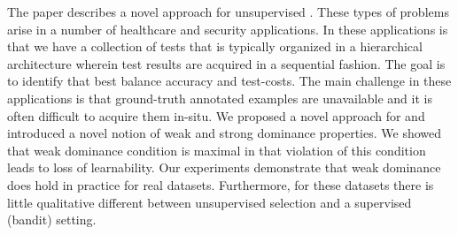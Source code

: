The paper describes a novel approach for unsupervised \ses. These types of problems arise in a number of healthcare and security applications. In these applications is that we have a collection of tests that is typically organized in a hierarchical architecture wherein test results are acquired in a sequential fashion. The goal is to identify that best balance accuracy and test-costs. The main challenge in these applications is that ground-truth annotated examples are unavailable and it is often difficult to acquire them in-situ. We proposed a novel approach for \ses and introduced a novel notion of weak and strong dominance properties. We showed that weak dominance condition is maximal in that violation of this condition leads to loss of learnability. Our experiments demonstrate that weak dominance does hold in practice for real datasets. Furthermore, for these datasets there is little qualitative different between unsupervised selection and a supervised (bandit) setting. 


%
%
